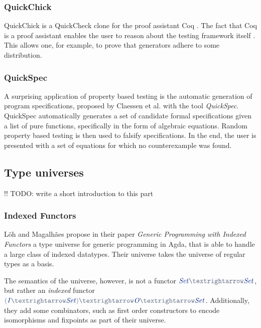\documentclass[a4paper,msc,twosized=semi]{uustthesis}
\newcommand*{\mathcolor}{}
\def\mathcolor#1#{\mathcoloraux{#1}}
\newcommand*{\mathcoloraux}[3]{%
  \protect\leavevmode
  \begingroup
    \color#1{#2}#3%
  \endgroup
}
\newcommand{\HSSpecial}[1]{\mathcolor{hsblue4}{#1}}
\newcommand{\HSSym}[1]{\mathcolor{hsblue4}{#1}}
\newcommand{\HSCon}[1]{\mathcolor{hsblue3}{\mathit{#1}}}
\begin{document}
\subsubsection{QuickChick} 

  QuickChick is a QuickCheck clone for the proof assistant Coq \cite
  {denes2014quickchick}. The fact that Coq is a proof assistant enables the user to 
  reason about the testing framework itself \cite{paraskevopoulou2015foundational}. 
  This allows one, for example, to prove that generators adhere to some distribution. 

\subsubsection{QuickSpec}

  A surprising application of property based testing is the automatic generation of 
  program specifications, proposed by Claessen et al. \cite{claessen2010quickspec} 
  with the tool \textit{QuickSpec}. QuickSpec automatically generates a set of 
  candidate formal specifications given a list of pure functions, specifically in the 
  form of algebraic equations. Random property based testing is then used to falsify 
  specifications. In the end, the user is presented with a set of equations for which 
  no counterexample was found.  

\subsection{Type universes}

  !! TODO: write a short introduction to this part

\subsubsection{Indexed Functors}

  Löh and Magalhães propose in their paper \emph{Generic Programming with Indexed 
  Functors} \cite{loh2011generic} a type universe for generic programming in Agda, 
  that is able to handle a large class of indexed datatypes. Their universe takes the 
  universe of regular types as a basis. 
  
  The semantics of the universe, however, is not a functor \ensuremath{\HSCon{Set}\HSSym{→}\HSCon{Set}}, but rather an 
  \emph{indexed} functor \ensuremath{\HSSpecial{(}\HSCon{I}\HSSym{→}\HSCon{Set}\HSSpecial{)}\HSSym{→}\HSCon{O}\HSSym{→}\HSCon{Set}}. Additionally, they add some 
  combinators, such as first order constructors to encode isomorphisms and fixpoints 
  as part of their universe. 
\end{document}
